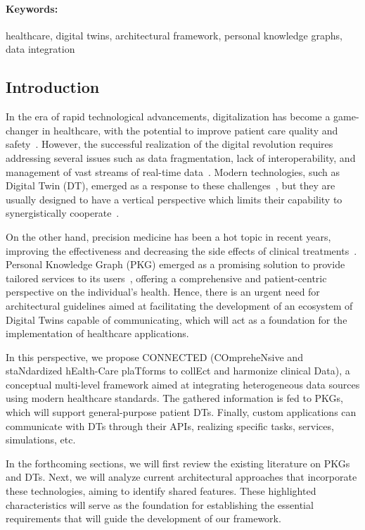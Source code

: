 \paragraph{Keywords:} healthcare, digital twins, architectural framework, personal knowledge graphs, data integration

\subsection{Introduction}

In the era of rapid technological advancements, digitalization has become a game-changer in healthcare, with the potential to improve patient care quality and safety~\cite{engstrom_impact_2023}. However, the successful realization of the digital revolution requires addressing several issues such as data fragmentation, lack of interoperability, and management of vast streams of real-time data~\cite{mumtaz_current_2023}. Modern technologies, such as Digital Twin (DT), emerged as a response to these challenges~\cite{sun_digital_2023}, but they are usually designed to have a vertical perspective which limits their capability to synergistically cooperate~\cite{9325551_ricci}.  

On the other hand, precision medicine has been a hot topic in recent years, improving the effectiveness and decreasing the side effects of clinical treatments~\cite{cailleaux_fused_2021}. Personal Knowledge Graph (PKG) emerged as a promising solution to provide tailored services to its users~\cite{skjaeveland_ecosystem_2023}, offering a comprehensive and patient-centric perspective on the individual’s health. Hence, there is an urgent need for architectural guidelines aimed at facilitating the development of an ecosystem of Digital Twins capable of communicating, which will act as a foundation for the implementation of healthcare applications. 

In this perspective, we propose CONNECTED (COmpreheNsive and staNdardized hEalth-Care plaTforms to collEct and harmonize clinical Data), a conceptual multi-level framework aimed at integrating heterogeneous data sources using modern healthcare standards. The gathered information is fed to PKGs, which will support general-purpose patient DTs. Finally, custom applications can communicate with DTs through their APIs, realizing specific tasks, services, simulations, etc.

In the forthcoming sections, we will first review the existing literature on PKGs and DTs. Next, we will analyze current architectural approaches that incorporate these technologies, aiming to identify shared features. These highlighted characteristics will serve as the foundation for establishing the essential requirements that will guide the development of our framework.

